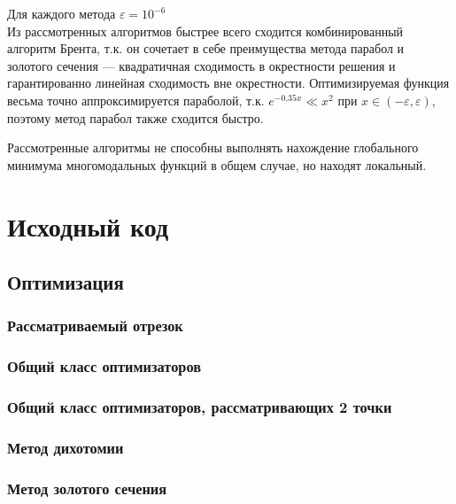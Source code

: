 Для каждого метода $\varepsilon = 10^{-6}$\\

Из рассмотренных алгоритмов быстрее всего сходится комбинированный алгоритм Брента, т.к. он сочетает в себе преимущества метода парабол и золотого сечения --- квадратичная сходимость в окрестности решения и гарантированно линейная сходимость вне окрестности. Оптимизируемая функция весьма точно аппроксимируется параболой, т.к. \(e^{ - 0.35 x} \ll x^2\) при \(x\in( - \varepsilon, \varepsilon)\), поэтому метод парабол также сходится быстро.

Рассмотренные алгоритмы не способны выполнять нахождение глобального минимума многомодальных функций в общем случае, но находят локальный.

\newpage
\section{Исходный код}

\subsection{Оптимизация}

\subsubsection{Рассматриваемый отрезок}
\newpage

\subsubsection{Общий класс оптимизаторов}
\newpage

\subsubsection{Общий класс оптимизаторов, рассматривающих 2 точки}
\newpage

\subsubsection{Метод дихотомии}
\newpage

\subsubsection{Метод золотого сечения}
\newpage

